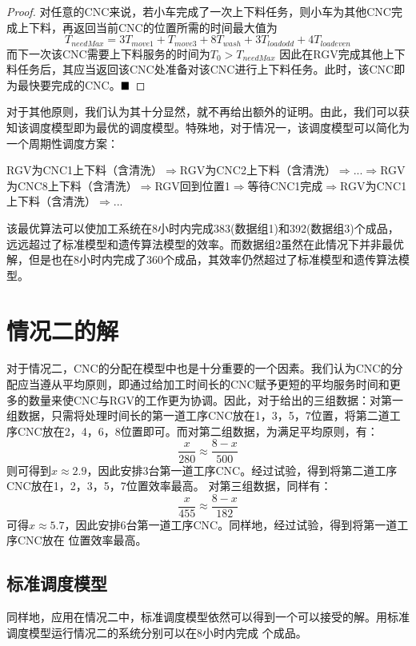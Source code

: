 \documentclass{cumcmthesis}
\begin{document}
	\begin{proof}
		对任意的CNC来说，若小车完成了一次上下料任务，则小车为其他CNC完成上下料，再返回当前CNC的位置所需的时间最大值为
		\[T_{needMax}=3T_{move 1}+T_{move 3}+8T_{wash}+3T_{load odd}+4T_{load even}\]
		而下一次该CNC需要上下料服务的时间为$T_0>T_{needMax}$
		因此在RGV完成其他上下料任务后，其应当返回该CNC处准备对该CNC进行上下料任务。此时，该CNC即为最快要完成的CNC。$\hfill\blacksquare$
	\end{proof}
	对于其他原则，我们认为其十分显然，就不再给出额外的证明。由此，我们可以获知该调度模型即为最优的调度模型。特殊地，对于情况一，该调度模型可以简化为一个周期性调度方案：
	\begin{center}
	\fangsong
	RGV为CNC1上下料（含清洗）$\Rightarrow$RGV为CNC2上下料（含清洗）$\Rightarrow$...\newline$\Rightarrow$RGV为CNC8上下料（含清洗）$\Rightarrow$RGV回到位置1\newline$\Rightarrow$等待CNC1完成$\Rightarrow$RGV为CNC1上下料（含清洗）$\Rightarrow$...
	\end{center}
	该最优算法可以使加工系统在8小时内完成383(数据组1)和392(数据组3)个成品，远远超过了标准模型和遗传算法模型的效率。而数据组2虽然在此情况下并非最优解，但是也在8小时内完成了360个成品，其效率仍然超过了标准模型和遗传算法模型。

	\section{情况二的解}
	对于情况二，CNC的分配在模型中也是十分重要的一个因素。我们认为CNC的分配应当遵从平均原则，即通过给加工时间长的CNC赋予更短的平均服务时间和更多的数量来使CNC与RGV的工作更为协调。因此，对于给出的三组数据：对第一组数据，只需将处理时间长的第一道工序CNC放在1，3，5，7位置，将第二道工序CNC放在2，4，6，8位置即可。而对第二组数据，为满足平均原则，有：
	$$\frac{x}{280}\approx \frac{8-x}{500}$$
	则可得到$x\approx 2.9$，因此安排3台第一道工序CNC。经过试验，得到将第二道工序CNC放在1，2，3，5，7位置效率最高。\newline
	对第三组数据，同样有：
	$$\frac{x}{455}\approx\frac{8-x}{182}$$
	可得$x\approx 5.7$，因此安排6台第一道工序CNC。同样地，经过试验，得到将第一道工序CNC放在 位置效率最高。
	
	\subsection{标准调度模型}
	同样地，应用在情况二中，标准调度模型依然可以得到一个可以接受的解。用标准调度模型运行情况二的系统分别可以在8小时内完成 个成品。
\end{document}
